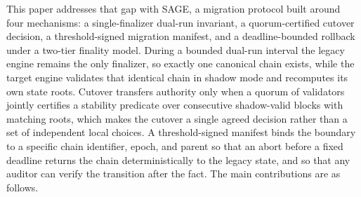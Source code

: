 \documentclass[journal]{IEEEtran}
\theoremstyle{remark}
\begin{document}
This paper addresses that gap with SAGE, a migration protocol built around four
mechanisms: a single-finalizer dual-run invariant, a quorum-certified cutover decision, a
threshold-signed migration manifest, and a deadline-bounded rollback under a two-tier
finality model. During a bounded dual-run interval the legacy engine remains the only
finalizer, so exactly one canonical chain exists, while the target engine validates that
identical chain in shadow mode and recomputes its own state roots. Cutover transfers
authority only when a quorum of validators jointly certifies a stability predicate over
consecutive shadow-valid blocks with matching roots, which makes the cutover a single
agreed decision rather than a set of independent local choices. A threshold-signed manifest
binds the boundary to a specific chain identifier, epoch, and parent so that an abort before
a fixed deadline returns the chain deterministically to the legacy state, and so that any
auditor can verify the transition after the fact. The main contributions are as follows.
\end{document}
